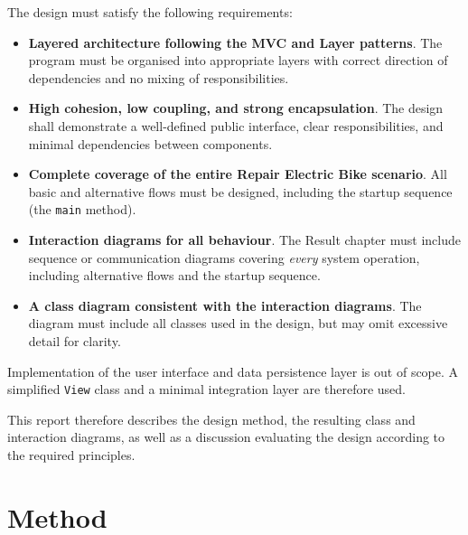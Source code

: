 \documentclass[a4paper]{scrartcl}
\begin{document}
The design must satisfy the following requirements:

\begin{itemize}
  \item \textbf{Layered architecture following the MVC and Layer patterns}.  
        The program must be organised into appropriate layers with correct direction of dependencies and no mixing of responsibilities.

  \item \textbf{High cohesion, low coupling, and strong encapsulation}.  
        The design shall demonstrate a well-defined public interface, clear responsibilities, and minimal dependencies between components.

  \item \textbf{Complete coverage of the entire Repair Electric Bike scenario}.  
        All basic and alternative flows must be designed, including the startup sequence (the \texttt{main} method).

  \item \textbf{Interaction diagrams for all behaviour}.  
        The Result chapter must include sequence or communication diagrams covering \emph{every} system operation, including alternative flows and the startup sequence.

  \item \textbf{A class diagram consistent with the interaction diagrams}.  
        The diagram must include all classes used in the design, but may omit excessive detail for clarity.
\end{itemize}

Implementation of the user interface and data persistence layer is out of scope. A simplified \texttt{View} class and a minimal integration layer are therefore used.

This report therefore describes the design method, the resulting class and interaction diagrams, as well as a discussion evaluating the design according to the required principles.

\section{Method}
\end{document}

